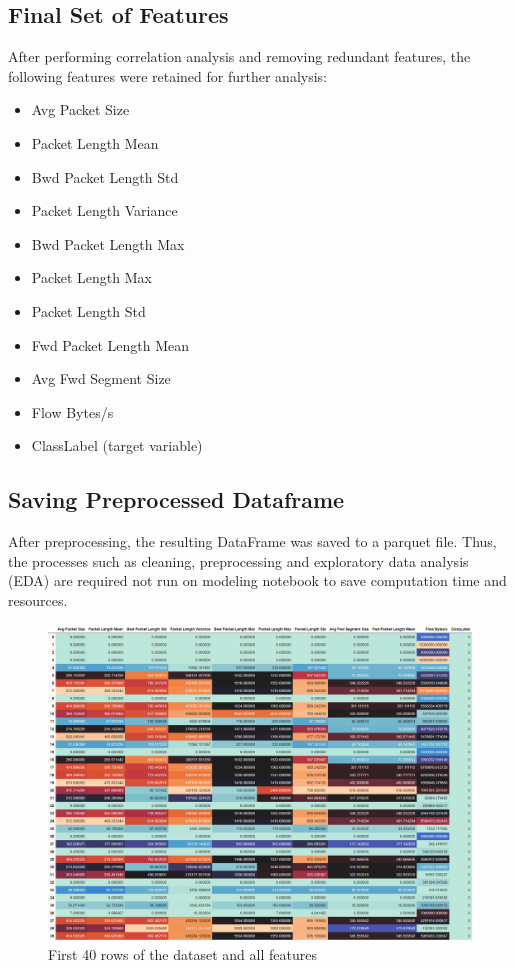 \documentclass[conference]{IEEEtran}
\begin{document}
	\subsection{Final Set of Features}
	After performing correlation analysis and removing redundant features, the following features were retained for further analysis:
	\begin{itemize}
		\item Avg Packet Size
		\item Packet Length Mean
		\item Bwd Packet Length Std
		\item Packet Length Variance
		\item Bwd Packet Length Max
		\item Packet Length Max
		\item Packet Length Std
		\item Fwd Packet Length Mean
		\item Avg Fwd Segment Size
		\item Flow Bytes/s
		\item ClassLabel (target variable)
	\end{itemize}
	
	\subsection{Saving Preprocessed Dataframe}
	After preprocessing, the resulting DataFrame was saved to a parquet file. Thus, the processes such as cleaning, preprocessing and exploratory data analysis (EDA) are required not run on modeling notebook to save computation time and resources.
	
	\begin{figure}[h]
		\includegraphics[width=\columnwidth]{my_df.png}
		\caption{First 40 rows of the dataset and all features}
	\end{figure}
	
\end{document}
